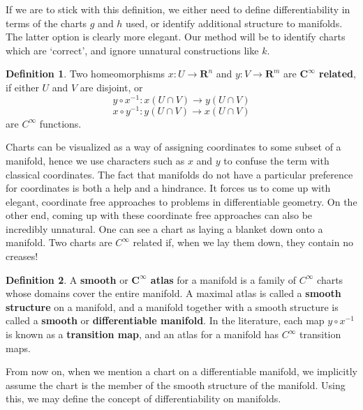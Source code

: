 \documentclass[12pt]{report}
\theoremstyle{plain}
\theoremstyle{definition}
\newtheorem*{defi}{Definition}
\newenvironment{definition}
    {\begin{samepage}\begin{framed}\begin{defi}}
    {\end{defi}\end{framed}\end{samepage}}
\begin{document}
If we are to stick with this definition, we either need to define differentiability in terms of the charts $g$ and $h$ used, or identify additional structure to manifolds. The latter option is clearly more elegant. Our method will be to identify charts which are `correct', and ignore unnatural constructions like $k$.

\begin{definition}
    Two homeomorphisms $x:U \to \mathbf{R}^n$ and $y:V \to \mathbf{R}^m$ are {\bf $\mathbf{C^\infty}$ related}, if either $U$ and $V$ are disjoint, or
    \[ y \circ x^{-1} : x(U \cap V) \to y(U \cap V) \]
    \[ x \circ y^{-1} : y(U \cap V) \to x(U \cap V) \]
    are $C^\infty$ functions.
\end{definition}

Charts can be visualized as a way of assigning coordinates to some subset of a manifold, hence we use characters such as $x$ and $y$ to confuse the term with classical coordinates. The fact that manifolds do not have a particular preference for coordinates is both a help and a hindrance. It forces us to come up with elegant, coordinate free approaches to problems in differentiable geometry. On the other end, coming up with these coordinate free approaches can also be incredibly unnatural. One can see a chart as laying a blanket down onto a manifold. Two charts are $C^\infty$ related if, when we lay them down, they contain no creases!

\begin{definition}
    A {\bf smooth} or {\bf $\mathbf{C^\infty}$ atlas} for a manifold is a family of $C^\infty$ charts whose domains cover the entire manifold. A maximal atlas is called a {\bf smooth structure} on a manifold, and a manifold together with a smooth structure is called a {\bf smooth} or {\bf differentiable manifold}. In the literature, each map $y \circ x^{-1}$ is known as a {\bf transition map}, and an atlas for a manifold has $C^\infty$ transition maps.
\end{definition}

From now on, when we mention a chart on a differentiable manifold, we implicitly assume the chart is the member of the smooth structure of the manifold. Using this, we may define the concept of differentiability on manifolds.
\end{document}
